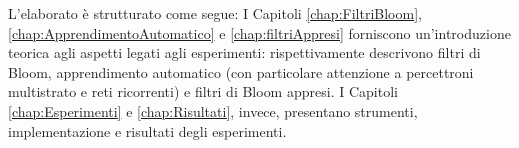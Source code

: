 \documentclass[../../main.tex]{subfiles}
\begin{document}
    L'elaborato è strutturato come segue: I Capitoli \ref{chap:FiltriBloom}, \ref{chap:ApprendimentoAutomatico} e \ref{chap:filtriAppresi} forniscono un'introduzione teorica agli aspetti legati agli esperimenti: rispettivamente descrivono filtri di Bloom, apprendimento automatico (con particolare attenzione a percettroni multistrato e reti ricorrenti) e filtri di Bloom appresi. I Capitoli \ref{chap:Esperimenti} e \ref{chap:Risultati}, invece, presentano strumenti, implementazione e risultati degli esperimenti. 
\end{document}
